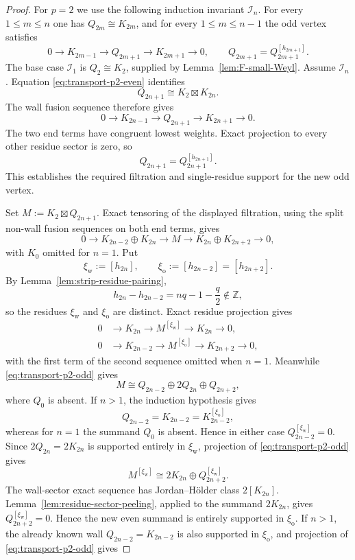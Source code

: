 \documentclass[12pt,leqno]{amsart}
\numberwithin{equation}{section}
\newcommand{\boxt}{\boxtimes}
\def\Z{\mathbb{Z}}
\begin{document}
\begin{proof}
For $p=2$ we use the following induction invariant $\mathcal I_n$.
For every $1\le m\le n$ one has $Q_{2m}\cong K_{2m}$, and for every
$1\le m\le n-1$ the odd vertex satisfies
\[
 0\to K_{2m-1}\to Q_{2m+1}\to K_{2m+1}\to0,
 \qquad Q_{2m+1}=Q_{2m+1}^{[h_{2m+1}]}.
\]
The base case $\mathcal I_1$ is $Q_2\cong K_2$, supplied by
Lemma~\ref{lem:F-small-Weyl}.  Assume $\mathcal I_n$.  Equation
\eqref{eq:transport-p2-even} identifies
\[
 Q_{2n+1}\cong K_2\boxt K_{2n}.
\]
The wall fusion sequence therefore gives
\[
 0\to K_{2n-1}\to Q_{2n+1}\to K_{2n+1}\to0.
\]
The two end terms have congruent lowest weights.  Exact projection to every
other residue sector is zero, so
\[
 Q_{2n+1}=Q_{2n+1}^{[h_{2n+1}]}.
\]
This establishes the required filtration and single-residue support for the
new odd vertex.

Set $M:=K_2\boxt Q_{2n+1}$.  Exact tensoring of the displayed filtration,
using the split non-wall fusion sequences on both end terms, gives
\[
 0\to K_{2n-2}\oplus K_{2n}\to M
 \to K_{2n}\oplus K_{2n+2}\to0,
\]
with $K_0$ omitted for $n=1$.  Put
\[
 \xi_{\mathrm w}:=[h_{2n}],\qquad
 \xi_{\mathrm o}:=[h_{2n-2}]=[h_{2n+2}].
\]
By Lemma~\ref{lem:strip-residue-pairing},
\[
 h_{2n}-h_{2n-2}=nq-1-\frac q2\notin\Z,
\]
so the residues $\xi_{\mathrm w}$ and $\xi_{\mathrm o}$ are distinct.  Exact residue projection
gives
\begin{align*}
 0&\to K_{2n}\to M^{[\xi_{\mathrm w}]}
     \to K_{2n}\to0,\\
 0&\to K_{2n-2}\to M^{[\xi_{\mathrm o}]}
     \to K_{2n+2}\to0,
\end{align*}
with the first term of the second sequence omitted when $n=1$.
Meanwhile \eqref{eq:transport-p2-odd} gives
\[
 M\cong Q_{2n-2}\oplus2Q_{2n}\oplus Q_{2n+2},
\]
where $Q_0$ is absent.  If $n>1$, the induction hypothesis gives
\[
 Q_{2n-2}=K_{2n-2}=K_{2n-2}^{[\xi_{\mathrm o}]},
\]
whereas for $n=1$ the summand $Q_0$ is absent.  Hence in either case
$Q_{2n-2}^{[\xi_{\mathrm w}]}=0$.  Since
$2Q_{2n}=2K_{2n}$ is supported entirely in $\xi_{\mathrm w}$,
projection of \eqref{eq:transport-p2-odd} gives
\[
 M^{[\xi_{\mathrm w}]}
 \cong2K_{2n}\oplus Q_{2n+2}^{[\xi_{\mathrm w}]}.
\]
The wall-sector exact sequence has Jordan--H\"older class
$2[K_{2n}]$.  Lemma~\ref{lem:residue-sector-peeling}, applied to the
summand $2K_{2n}$, gives $Q_{2n+2}^{[\xi_{\mathrm w}]}=0$.  Hence the new even summand is entirely
supported in $\xi_{\mathrm o}$.  If $n>1$, the already known wall
$Q_{2n-2}=K_{2n-2}$ is also supported in $\xi_{\mathrm o}$, and projection
of \eqref{eq:transport-p2-odd} gives

\end{proof}
\end{document}
